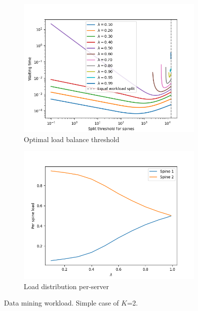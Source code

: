 \begin{figure}
	\centering
	\begin{subfigure}{.5\textwidth}
		\centering
		\includegraphics[width=.99\linewidth]{Chapter3/Figures/equal_workload_split_bpdm}
		\caption{Optimal load balance threshold}
		\label{fig:cost-dm}
	\end{subfigure}%
	\begin{subfigure}{.5\textwidth}
		\centering
		\includegraphics[width=.99\linewidth]{Chapter3/Figures/per_spine_load_bpdm}
		\caption{Load distribution per-server }
		\label{fig:perspineload-dm}
	\end{subfigure}
	\caption{Data mining workload. Simple case of $K$=2.}
	\label{fig:lbthreshold-dm}
\end{figure} %
